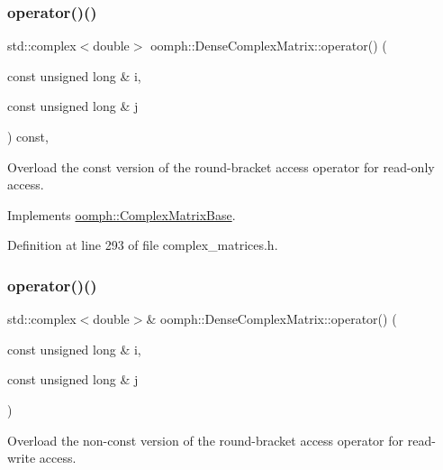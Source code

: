 \subsubsection{\texorpdfstring{operator()()}{operator()()}\hspace{0.1cm}{\footnotesize\ttfamily [1/2]}}
{\footnotesize\ttfamily std\+::complex$<$double$>$ oomph\+::\+Dense\+Complex\+Matrix\+::operator() (\begin{DoxyParamCaption}\item[{const unsigned long \&}]{i,  }\item[{const unsigned long \&}]{j }\end{DoxyParamCaption}) const\hspace{0.3cm}{\ttfamily [inline]}, {\ttfamily [virtual]}}



Overload the const version of the round-\/bracket access operator for read-\/only access. 



Implements \hyperlink{classoomph_1_1ComplexMatrixBase_a78d1185ec8249fec5855d01129a1c870}{oomph\+::\+Complex\+Matrix\+Base}.



Definition at line 293 of file complex\+\_\+matrices.\+h.

\mbox{\label{classoomph_1_1DenseComplexMatrix_a01aecdcd48d058067ac9b550e8147fa6}} 
\subsubsection{\texorpdfstring{operator()()}{operator()()}\hspace{0.1cm}{\footnotesize\ttfamily [2/2]}}
{\footnotesize\ttfamily std\+::complex$<$double$>$\& oomph\+::\+Dense\+Complex\+Matrix\+::operator() (\begin{DoxyParamCaption}\item[{const unsigned long \&}]{i,  }\item[{const unsigned long \&}]{j }\end{DoxyParamCaption})\hspace{0.3cm}{\ttfamily [inline]}}



Overload the non-\/const version of the round-\/bracket access operator for read-\/write access. 



